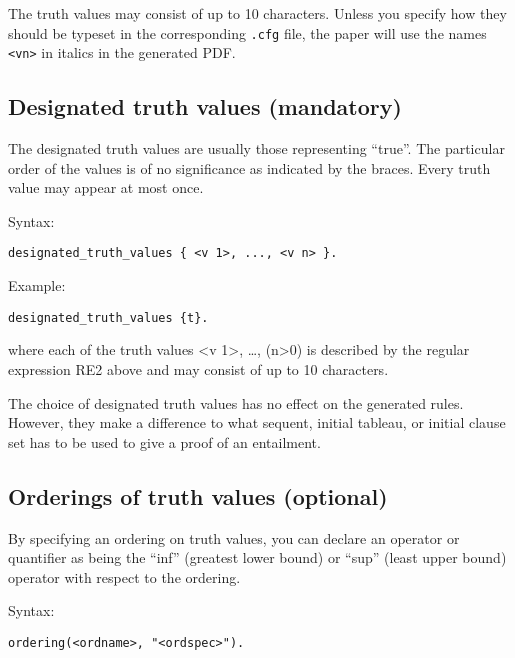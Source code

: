 \documentclass[
]{article}
\newcommand{\passthrough}[1]{#1}
\begin{document}
The truth values may consist of up to 10 characters. Unless you specify
how they should be typeset in the corresponding
\passthrough{\lstinline!.cfg!} file, the paper will use the names
\passthrough{\lstinline!<vn>!} in italics in the generated PDF.

\hypertarget{designated-truth-values-mandatory}{%
\subsection{Designated truth values
(mandatory)}\label{designated-truth-values-mandatory}}

The designated truth values are usually those representing ``true''. The
particular order of the values is of no significance as indicated by the
braces. Every truth value may appear at most once.

Syntax:

\begin{lstlisting}
designated_truth_values { <v 1>, ..., <v n> }.
\end{lstlisting}

Example:

\begin{lstlisting}
designated_truth_values {t}.
\end{lstlisting}

where each of the truth values \textless v 1\textgreater, \ldots,
(n\textgreater0) is described by the regular expression RE2 above and
may consist of up to 10 characters.

The choice of designated truth values has no effect on the generated
rules. However, they make a difference to what sequent, initial tableau,
or initial clause set has to be used to give a proof of an entailment.

\hypertarget{orderings-of-truth-values-optional}{%
\subsection{Orderings of truth values
(optional)}\label{orderings-of-truth-values-optional}}

By specifying an ordering on truth values, you can declare an operator
or quantifier as being the ``inf'' (greatest lower bound) or ``sup''
(least upper bound) operator with respect to the ordering.

Syntax:

\begin{lstlisting}
ordering(<ordname>, "<ordspec>").
\end{lstlisting}
\end{document}
